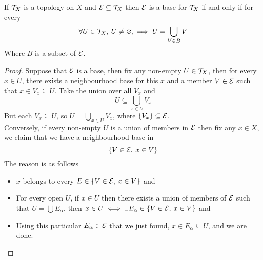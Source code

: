 \documentclass[../../main.tex]{subfiles}
\begin{document}
\begin{wts}
    If $\mathcal{T}_X$ is a topology on $X$ and $\mathcal{E}\subseteq\mathcal{T}_X$ then $\mathcal{E}$ is a base for $\mathcal{T}_X$ if and only if for every 
    \[
    \forall U\in\mathcal{T}_X,\:U\neq\varnothing,\implies U=\bigcup_{V\in B}V
    \]
    Where $B$ is a subset of $\mathcal{E}$.
\end{wts}
\begin{proof}
    Suppose that $\mathcal{E}$ is a base, then fix any non-empty $U\in\mathcal{T}_X$, then for every $x\in U$, there exists a neighbourhood base for this $x$ and a member $V\in\mathcal{E}$ such that $x\in V_x\subseteq U$. Take the union over all $V_x$ and
    \[
    U\subseteq \bigcup_{x\in U}V_x
    \]
    But each $V_x\subseteq U$, so $U=\bigcup_{x\in U}V_x$, where $\{V_x\}\subseteq\mathcal{E}$.\\
    
    Conversely, if every non-empty $U$ is a union of members in $\mathcal{E}$ then fix any $x\in X$, we claim that we have a neighbourhood base in
    \[
    \{V\in\mathcal{E},\:x\in V\}
    \]
    The reason is as follows
    \begin{itemize}
        \item $x$ belongs to every $E\in \{V\in\mathcal{E},\:x\in V\}$ and
        \item For every open $U$, if $x\in U$ then there exists a union of members of $\mathcal{E}$ such that $U = \bigcup E_\alpha$, then $x\in U\iff\exists
        E_\alpha\in\{V\in\mathcal{E},\: x\in V\}$ and
        \item Using this particular $E_\alpha\in\mathcal{E}$ that we just found, $x\in E_\alpha\subseteq U$, and we are done.
    \end{itemize}
\end{proof}
\end{document}
